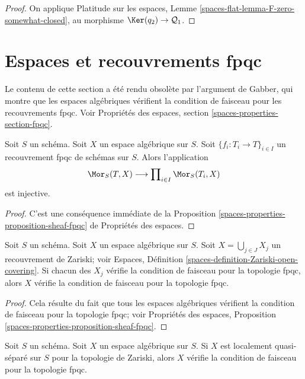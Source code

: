 \begin{proof}
On applique Platitude sur les espaces, Lemme \ref{spaces-flat-lemma-F-zero-somewhat-closed},
au morphisme $\Ker(q_2) \to \mathcal{Q}_1$.
\end{proof}







\section{Espaces et recouvrements fpqc}
\label{section-fpqc}

\noindent
Le contenu de cette section a \'et\'e rendu obsol\`ete par l'argument de Gabber, qui montre que
les espaces alg\'ebriques v\'erifient la condition de faisceau pour les
recouvrements fpqc. Voir
Propri\'et\'es des espaces, section \ref{spaces-properties-section-fpqc}.

\begin{lemma}
\label{lemma-separated-fpqc}
Soit $S$ un sch\'ema. Soit $X$ un espace alg\'ebrique sur $S$.
Soit $\{f_i : T_i \to T\}_{i \in I}$ un recouvrement fpqc de sch\'emas sur $S$.
Alors l'application
$$
\Mor_S(T, X)
\longrightarrow
\prod\nolimits_{i \in I} \Mor_S(T_i, X)
$$
est injective.
\end{lemma}

\begin{proof}
C'est une cons\'equence imm\'ediate de la Proposition
\ref{spaces-properties-proposition-sheaf-fpqc}
de Propri\'et\'es des espaces.
\end{proof}

\begin{lemma}
\label{lemma-sheaf-fpqc-open-covering}
Soit $S$ un sch\'ema. Soit $X$ un espace alg\'ebrique sur $S$.
Soit $X = \bigcup_{j \in J} X_j$ un recouvrement de Zariski; voir
Espaces, D\'efinition \ref{spaces-definition-Zariski-open-covering}.
Si chacun des $X_j$ v\'erifie la condition de faisceau pour la topologie fpqc,
alors $X$ v\'erifie la condition de faisceau pour la topologie fpqc.
\end{lemma}

\begin{proof}
Cela r\'esulte du fait que tous les espaces alg\'ebriques v\'erifient la condition
de faisceau pour la topologie fpqc; voir
Propri\'et\'es des espaces, Proposition
\ref{spaces-properties-proposition-sheaf-fpqc}.
\end{proof}

\begin{lemma}
\label{lemma-sheaf-fpqc-quasi-separated}
Soit $S$ un sch\'ema. Soit $X$ un espace alg\'ebrique sur $S$.
Si $X$ est localement quasi-s\'epar\'e sur $S$ pour la topologie de Zariski,
alors $X$ v\'erifie la condition de faisceau pour la topologie fpqc.
\end{lemma}

